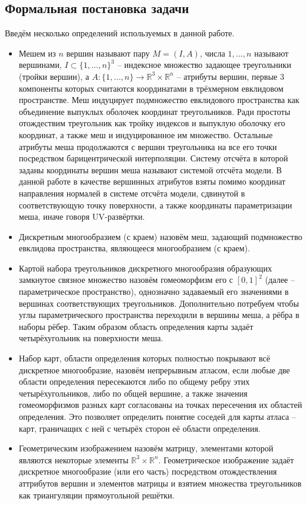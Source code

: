 \subsection{Формальная постановка задачи}
Введём несколько определений используемых в данной работе.
\begin{itemize}
\item Мешем из $n$ вершин называют пару $M = (I, A)$, числа $1,...,n$ называют вершинами, $I \subset \{1, ..., n\}^3$ -- индексное множество задающее треугольники (тройки вершин), а $A: \{1, ..., n\} \rightarrow \mathbb{R}^3 \times \mathbb{R}^n$ -- атрибуты вершин, первые 3 компоненты которых считаются координатами в трёхмерном евклидовом пространстве. Меш индуцирует подмножество евклидового пространства как объединение выпуклых оболочек координат треугольников. Ради простоты отождествим треугольник как тройку индексов и выпуклую оболочку его координат, а также меш и индуцированное им множество. Остальные атрибуты меша продолжаются с вершин треугольника на все его точки посредством барицентрической интерполяции. Систему отсчёта в которой заданы координаты вершин меша называют системой отсчёта модели. В данной работе в качестве вершинных атрибутов взяты помимо координат направления нормалей в системе отсчёта модели, сдвинутой в соответствующую точку поверхности, а также координаты параметризации меша, иначе говоря UV-развёртки.
\item Дискретным многообразием (с краем) назовём меш, задающий подмножество евклидова пространства, являющееся многообразием (с краем).
\item Картой набора треугольников дискретного многообразия образующих замкнутое связное множество назовём гомеоморфизм его с $[0,1]^2$ (далее -- параметрическое пространство), однозначно задаваемый его значениями в вершинах соответствующих треугольников. Дополнительно потребуем чтобы углы параметрического пространства переходили в вершины меша, а рёбра в наборы рёбер. Таким образом область определения карты задаёт четырёхугольник на поверхности меша.
\item Набор карт, области определения которых полностью покрывают всё дискретное многообразие, назовём непрерывным атласом, если любые две области определения пересекаются либо по общему ребру этих четырёхугольников, либо по общей вершине, а также значения гомеоморфизмов разных карт согласованы на точках пересечения их областей определения. Это позволяет определить понятие соседей для карты атласа -- карт, граничащих с ней с четырёх сторон её области определения.
\item Геометрическим изображением назовём матрицу, элементами которой являются некоторые элементы $\mathbb{R}^3\times \mathbb{R}^n$. Геометрическое изображение задаёт дискретное многообразие (или его часть) посредством отождествления аттрибутов вершин и элементов матрицы и взятием множества треугольников как триангуляции прямоугольной решётки.

\end{itemize}

